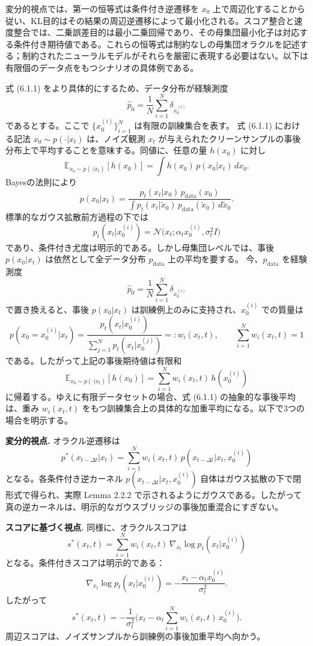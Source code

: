 変分的視点では、第一の恒等式は条件付き逆遷移を $x_0$ 上で周辺化することから従い、KL目的はその結果の周辺逆遷移によって最小化される。スコア整合と速度整合では、二乗誤差目的は最小二乗回帰であり、その母集団最小化子は対応する条件付き期待値である。これらの恒等式は制約なしの母集団オラクルを記述する；制約されたニューラルモデルがそれらを厳密に表現する必要はない。以下は有限個のデータ点をもつシナリオの具体例である。

\begin{propositionbox}[例：有限データセット上の閉形式オラクル目標]
式 (6.1.1) をより具体的にするため、データ分布が経験測度
\[
\hat{p}_0 = \frac{1}{N}\sum_{i=1}^N \delta_{x_0^{(i)}}
\]
であるとする。ここで $\{x_0^{(i)}\}_{i=1}^N$ は有限の訓練集合を表す。
式 (6.1.1) における記法 $x_0 \sim p(\cdot|x_t)$ は、ノイズ観測 $x_t$ が与えられたクリーンサンプルの事後分布上で平均することを意味する。同値に、任意の量 $h(x_0)$ に対し
\[
\mathbb{E}_{x_0\sim p(\cdot|x_t)}[h(x_0)] = \int h(x_0)\, p(x_0|x_t)\, dx_0.
\]
Bayesの法則により
\[
p(x_0|x_t) = \frac{p_t(x_t|x_0)\, p_{\mathrm{data}}(x_0)}{\int p_t(x_t|\tilde{x}_0)\, p_{\mathrm{data}}(\tilde{x}_0)\, d\tilde{x}_0}.
\]
標準的なガウス拡散前方過程の下では
\[
p_t(x_t|x_0^{(i)}) = \mathcal{N}\bigl(x_t; \alpha_t x_0^{(i)}, \sigma_t^2 I\bigr)
\]
であり、条件付き尤度は明示的である。しかし母集団レベルでは、事後 $p(x_0|x_t)$ は依然として全データ分布 $p_{\mathrm{data}}$ 上の平均を要する。
今、$p_{\mathrm{data}}$ を経験測度
\[
\hat{p}_0 = \frac{1}{N}\sum_{i=1}^N \delta_{x_0^{(i)}}
\]
で置き換えると、事後 $p(x_0|x_t)$ は訓練例上のみに支持され、$x_0^{(i)}$ での質量は
\[
p(x_0 = x_0^{(i)}|x_t) = \frac{p_t(x_t|x_0^{(i)})}{\sum_{j=1}^N p_t(x_t|x_0^{(j)})} =: w_i(x_t, t), \qquad \sum_{i=1}^N w_i(x_t, t) = 1
\]
である。したがって上記の事後期待値は有限和
\[
\mathbb{E}_{x_0\sim p(\cdot|x_t)}[h(x_0)] = \sum_{i=1}^N w_i(x_t, t)\, h(x_0^{(i)})
\]
に帰着する。ゆえに有限データセットの場合、式 (6.1.1) の抽象的な事後平均は、重み $w_i(x_t, t)$ をもつ訓練集合上の具体的な加重平均になる。以下で3つの場合を明示する。

\textbf{変分的視点.} オラクル逆遷移は
\[
p^*(x_{t-\Delta t}|x_t) = \sum_{i=1}^N w_i(x_t, t)\, p(x_{t-\Delta t}|x_t, x_0^{(i)})
\]
となる。各条件付き逆カーネル $p(x_{t-\Delta t}|x_t, x_0^{(i)})$ 自体はガウス拡散の下で閉形式で得られ、実際 Lemma 2.2.2 で示されるようにガウスである。したがって真の逆カーネルは、明示的なガウスブリッジの事後加重混合にすぎない。

\textbf{スコアに基づく視点.} 同様に、オラクルスコアは
\[
s^*(x_t, t) = \sum_{i=1}^N w_i(x_t, t)\, \nabla_{x_t}\log p_t(x_t|x_0^{(i)})
\]
となる。条件付きスコアは明示的である：
\[
\nabla_{x_t}\log p_t(x_t|x_0^{(i)}) = -\frac{x_t - \alpha_t x_0^{(i)}}{\sigma_t^2}.
\]
したがって
\[
s^*(x_t, t) = -\frac{1}{\sigma_t^2}\Biggl(x_t - \alpha_t\sum_{i=1}^N w_i(x_t, t)\, x_0^{(i)}\Biggr).
\]
周辺スコアは、ノイズサンプルから訓練例の事後加重平均へ向かう。


\end{propositionbox}
